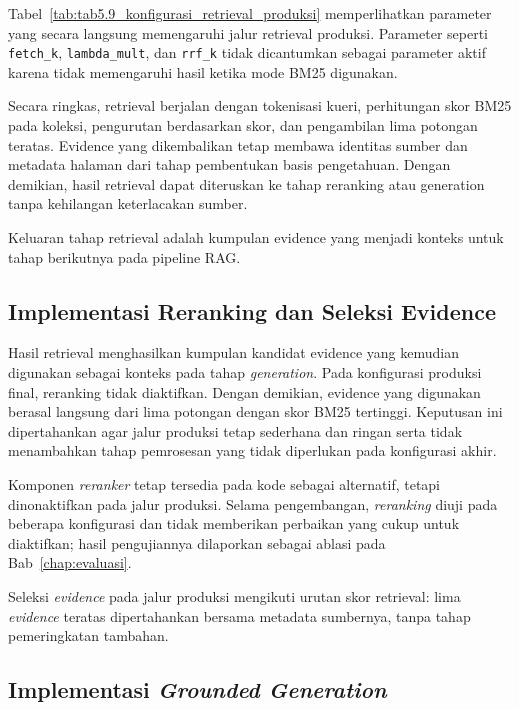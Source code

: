 

Tabel~\ref{tab:tab5.9_konfigurasi_retrieval_produksi} memperlihatkan parameter yang secara langsung memengaruhi jalur retrieval produksi. Parameter seperti
\texttt{fetch\_k}, \texttt{lambda\_mult}, dan \texttt{rrf\_k} tidak dicantumkan sebagai parameter aktif karena tidak memengaruhi hasil ketika mode BM25
digunakan.

Secara ringkas, retrieval berjalan dengan tokenisasi kueri, perhitungan skor BM25 pada koleksi, pengurutan berdasarkan skor, dan pengambilan lima potongan
teratas. Evidence yang dikembalikan tetap membawa identitas sumber dan metadata halaman dari tahap pembentukan basis pengetahuan. Dengan demikian, hasil
retrieval dapat diteruskan ke tahap reranking atau generation tanpa kehilangan keterlacakan sumber.

Keluaran tahap retrieval adalah kumpulan evidence yang menjadi konteks untuk tahap berikutnya pada pipeline RAG.


\subsection{Implementasi Reranking dan Seleksi Evidence}
\label{subsec:bab5-reranking-evidence-selection}

Hasil retrieval menghasilkan kumpulan kandidat evidence yang kemudian digunakan sebagai konteks pada tahap \textit{generation}. Pada konfigurasi produksi final,
reranking tidak diaktifkan. Dengan demikian, evidence yang digunakan berasal langsung dari lima potongan dengan skor BM25 tertinggi. Keputusan ini dipertahankan agar
jalur produksi tetap sederhana dan ringan serta tidak menambahkan tahap pemrosesan yang tidak diperlukan pada konfigurasi akhir.

Komponen \textit{reranker} tetap tersedia pada kode sebagai alternatif, tetapi dinonaktifkan pada jalur produksi. Selama pengembangan, \textit{reranking} diuji pada
beberapa konfigurasi dan tidak memberikan perbaikan yang cukup untuk diaktifkan; hasil pengujiannya dilaporkan sebagai ablasi pada Bab~\ref{chap:evaluasi}.

Seleksi \textit{evidence} pada jalur produksi mengikuti urutan skor retrieval: lima \textit{evidence} teratas dipertahankan bersama metadata sumbernya, tanpa
tahap pemeringkatan tambahan.

\subsection{Implementasi \textit{Grounded Generation}}
\label{subsec:bab5-grounded-generation}

